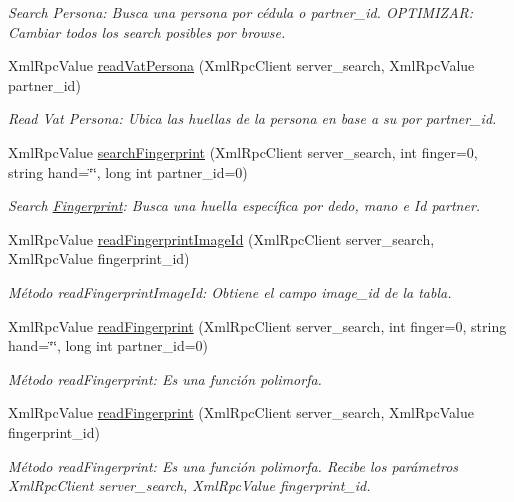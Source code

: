 \begin{DoxyCompactItemize}
\begin{DoxyCompactList}\small\item\em Search Persona\+: Busca una persona por cédula o partner\+\_\+id. O\+P\+T\+I\+M\+I\+Z\+AR\+: Cambiar todos los search posibles por browse. \end{DoxyCompactList}\item 
Xml\+Rpc\+Value \hyperlink{classFingerprint_a83bbd80ab7157b66a568c8a354f86f02}{read\+Vat\+Persona} (Xml\+Rpc\+Client server\+\_\+search, Xml\+Rpc\+Value partner\+\_\+id)
\begin{DoxyCompactList}\small\item\em Read Vat Persona\+: Ubica las huellas de la persona en base a su por partner\+\_\+id. \end{DoxyCompactList}\item 
Xml\+Rpc\+Value \hyperlink{classFingerprint_a35437b95c59d90bb3719f3d90f5f300b}{search\+Fingerprint} (Xml\+Rpc\+Client server\+\_\+search, int finger=0, string hand=\char`\"{}\char`\"{}, long int partner\+\_\+id=0)
\begin{DoxyCompactList}\small\item\em Search \hyperlink{classFingerprint}{Fingerprint}\+: Busca una huella específica por dedo, mano e Id partner. \end{DoxyCompactList}\item 
Xml\+Rpc\+Value \hyperlink{classFingerprint_a0aec9bd56a3983b0f5662c82258c32e2}{read\+Fingerprint\+Image\+Id} (Xml\+Rpc\+Client server\+\_\+search, Xml\+Rpc\+Value fingerprint\+\_\+id)
\begin{DoxyCompactList}\small\item\em Método read\+Fingerprint\+Image\+Id\+: Obtiene el campo image\+\_\+id de la tabla. \end{DoxyCompactList}\item 
Xml\+Rpc\+Value \hyperlink{classFingerprint_af2bb2ab8e1a31d1b7e41d39b728d1bb5}{read\+Fingerprint} (Xml\+Rpc\+Client server\+\_\+search, int finger=0, string hand=\char`\"{}\char`\"{}, long int partner\+\_\+id=0)
\begin{DoxyCompactList}\small\item\em Método read\+Fingerprint\+: Es una función polimorfa. \end{DoxyCompactList}\item 
Xml\+Rpc\+Value \hyperlink{classFingerprint_a62325335130ebc1a65263ce5cf18ddf8}{read\+Fingerprint} (Xml\+Rpc\+Client server\+\_\+search, Xml\+Rpc\+Value fingerprint\+\_\+id)
\begin{DoxyCompactList}\small\item\em Método read\+Fingerprint\+: Es una función polimorfa. Recibe los parámetros Xml\+Rpc\+Client server\+\_\+search, Xml\+Rpc\+Value fingerprint\+\_\+id. \end{DoxyCompactList}\item 

\end{DoxyCompactItemize}
